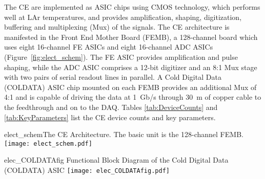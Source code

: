 The CE are implemented as ASIC chips using CMOS technology,
which performs well at LAr temperatures,
and provides amplification, shaping, digitization, buffering and multiplexing (Mux) of the signals.
The CE architecture is manifested in the Front End Mother Board (FEMB),
a 128-channel board which uses eight 16-channel FE ASICs and eight 16-channel ADC ASICs
(Figure~\ref{fig:elect_schem}).
The FE ASIC provides amplification and pulse shaping, while
the ADC ASIC comprises a 12-bit digitizer
and an 8:1 Mux stage with two pairs of serial readout lines in parallel.
A Cold Digital Data (COLDATA) ASIC chip mounted on each FEMB provides an additional Mux of 4:1 and
is capable of driving the data at 1~Gb/s through 30~m of copper cable to the feedthrough and on to the DAQ. 
Tables \ref{tab:DeviceCounts} and \ref{tab:KeyParameters} list the CE device counts and key parameters.
\vskip -10pt %
\begin{cdrfigure}{elect_schem}{The CE Architecture. The basic unit is the 128-channel FEMB.}
\texttt{[image: elect\_schem.pdf]}
\end{cdrfigure}
\begin{cdrfigure}{elec_COLDATAfig}
{Functional Block Diagram of the Cold Digital Data (COLDATA) ASIC}
\texttt{[image: elec\_COLDATAfig.pdf]}
\end{cdrfigure}


